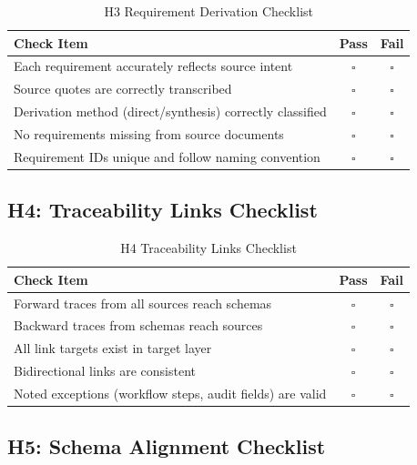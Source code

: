 \begin{table}[h]
\centering
\caption{H3 Requirement Derivation Checklist}
\begin{tabular}{@{}L{10cm}cc@{}}
\toprule
\textbf{Check Item} & \textbf{Pass} & \textbf{Fail} \\
\midrule
Each requirement accurately reflects source intent & $\square$ & $\square$ \\
Source quotes are correctly transcribed & $\square$ & $\square$ \\
Derivation method (direct/synthesis) correctly classified & $\square$ & $\square$ \\
No requirements missing from source documents & $\square$ & $\square$ \\
Requirement IDs unique and follow naming convention & $\square$ & $\square$ \\
\bottomrule
\end{tabular}
\end{table}

\subsection{H4: Traceability Links Checklist}

\begin{table}[h]
\centering
\caption{H4 Traceability Links Checklist}
\begin{tabular}{@{}L{10cm}cc@{}}
\toprule
\textbf{Check Item} & \textbf{Pass} & \textbf{Fail} \\
\midrule
Forward traces from all sources reach schemas & $\square$ & $\square$ \\
Backward traces from schemas reach sources & $\square$ & $\square$ \\
All link targets exist in target layer & $\square$ & $\square$ \\
Bidirectional links are consistent & $\square$ & $\square$ \\
Noted exceptions (workflow steps, audit fields) are valid & $\square$ & $\square$ \\
\bottomrule
\end{tabular}
\end{table}

\subsection{H5: Schema Alignment Checklist}

